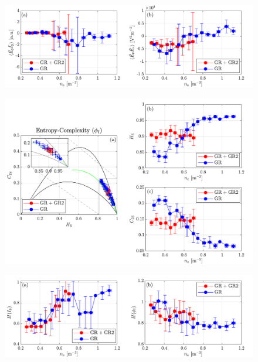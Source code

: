 \documentclass[preprint,12pt,authoryear]{elsarticle}
\begin{document}
\begin{figure}[!ht]

   \includegraphics[width=1.0\columnwidth]{Images/transition_2.pdf}
   \caption{}
   \label{Fig:transition_2}
\end{figure}
\begin{figure}[!ht]

   \includegraphics[width=1.0\columnwidth]{Images/transition_3.pdf}
   \caption{}
   \label{Fig:transition_3}
\end{figure}
\begin{figure}[!ht]

   \includegraphics[width=1.0\columnwidth]{Images/transition_4.pdf}
   \caption{}
   \label{Fig:transition_4}
\end{figure}
\end{document}
